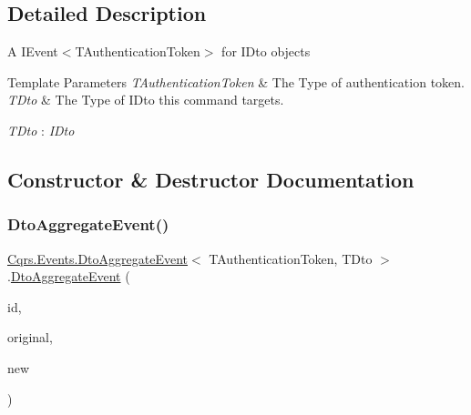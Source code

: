 \subsection{Detailed Description}
A I\+Event$<$\+T\+Authentication\+Token$>$ for I\+Dto objects 


\begin{DoxyTemplParams}{Template Parameters}
{\em T\+Authentication\+Token} & The Type of authentication token.\\
\hline
{\em T\+Dto} & The Type of I\+Dto this command targets.\\
\hline
\end{DoxyTemplParams}
\begin{Desc}
\item[Type Constraints]\begin{description}
\item[{\em T\+Dto} : {\em I\+Dto}]\end{description}
\end{Desc}


\subsection{Constructor \& Destructor Documentation}
\mbox{\label{classCqrs_1_1Events_1_1DtoAggregateEvent_a9741e3dae73892ee98408547ea953d4d_a9741e3dae73892ee98408547ea953d4d}} 
\subsubsection{\texorpdfstring{Dto\+Aggregate\+Event()}{DtoAggregateEvent()}}
{\footnotesize\ttfamily \hyperlink{classCqrs_1_1Events_1_1DtoAggregateEvent}{Cqrs.\+Events.\+Dto\+Aggregate\+Event}$<$ T\+Authentication\+Token, T\+Dto $>$.\hyperlink{classCqrs_1_1Events_1_1DtoAggregateEvent}{Dto\+Aggregate\+Event} (\begin{DoxyParamCaption}\item[{Guid}]{id,  }\item[{T\+Dto}]{original,  }\item[{T\+Dto @}]{new }\end{DoxyParamCaption})}




